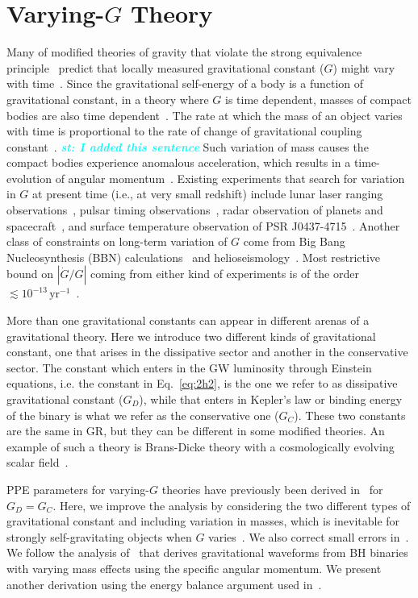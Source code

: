 \documentclass[prd,twocolumn,nofootinbib]{revtex4-1}
\newcommand{\st}[1]{\textcolor{cyan}{\it{\textbf{st: #1}}} }
\begin{document}
 \section{Varying-$G$ Theory}\label{gdot}
 
Many of modified theories of gravity that violate the strong equivalence principle~\cite{DiCasola:2013iia,Will:2014kxa,0264-9381-7-10-007} predict that locally measured gravitational constant ($G$) might vary with time~\cite{uzan:2010pm}. Since the gravitational self-energy of a body is a function of gravitational constant, in a theory where $G$ is time dependent, masses of compact bodies are also time dependent~\cite{PhysRevLett.65.953}. The rate at which the mass of an object varies with time is proportional to the rate of change of gravitational coupling constant~\cite{PhysRevLett.65.953}. \st{I added this sentence}Such variation of mass causes the compact bodies experience anomalous acceleration, which results in a time-evolution of angular momentum~\cite{PhysRevLett.65.953}. Existing experiments that search for variation in $G$ at present time (i.e., at very small redshift) include lunar laser ranging observations~\cite{Williams:2004qba}, pulsar timing observations~\cite{Deller:2008jx,Kaspi:1994hp}, radar observation of planets and spacecraft~\cite{Pitjeva2005}, and surface temperature observation of PSR J0437-4715~\cite{Jofre:2006ug}. Another class of constraints on long-term variation of $G$ come from Big Bang Nucleosynthesis (BBN) calculations~\cite{Bambi:2005fi,Copi:2003xd} and helioseismology~\cite{0004-637X-498-2-871}. Most restrictive bound on $|\dot{G}/G|$ coming from either kind of experiments is of the order $\lesssim 10^{-13} \,\mathrm{yr}^{-1}$~\cite{Yunes:2009bv}.

More than one gravitational constants can appear in different arenas of a gravitational theory. Here we introduce two different kinds of gravitational constant, one that arises in the dissipative sector and another in the conservative sector. The constant which enters in the GW luminosity through Einstein equations, i.e. the constant in Eq.~\eqref{eq:2h2}, is the one we refer to as dissipative gravitational constant ($G_D$), while that enters in Kepler's law or binding energy of the binary is what we refer as the conservative one ($G_C$). These two constants are the same in GR, but they can be different in some modified theories. An example of such a theory is Brans-Dicke theory with a cosmologically evolving scalar field~\cite{Will2006}. 

PPE parameters for varying-$G$ theories have previously been derived in~\cite{Yunes:2009bv} for $G_D = G_C$. Here, we improve the analysis by considering the two different types of gravitational constant and including variation in masses, which is inevitable for strongly self-gravitating objects when $G$ varies~\cite{PhysRevLett.65.953}.
We also correct small errors in~\cite{Yunes:2009bv}. We follow the analysis of~\cite{Yagi:2011yu} that derives gravitational waveforms from BH binaries with varying mass effects using the specific angular momentum. We present another derivation using the energy balance argument used in~\cite{Yunes:2009bv}.
\end{document}

